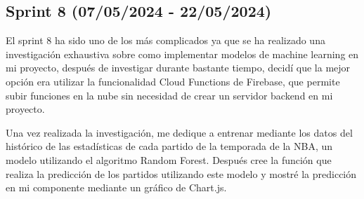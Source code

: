 \clearpage

\subsection{Sprint 8 (07/05/2024 - 22/05/2024)}
El sprint 8 ha sido uno de los más complicados ya que se ha realizado una investigación exhaustiva sobre como implementar modelos de machine learning en mi proyecto, después de investigar durante bastante tiempo, decidí que la mejor opción era utilizar la funcionalidad Cloud Functions de Firebase, que permite subir funciones en la nube sin necesidad de crear un servidor backend en mi proyecto.

Una vez realizada la investigación, me dedique a entrenar mediante los datos del histórico de las estadísticas de cada partido de la temporada de la NBA, un modelo utilizando el algoritmo Random Forest. Después cree la función que realiza la predicción de los partidos utilizando este modelo y mostré la predicción en mi componente mediante un gráfico de Chart.js.

\hfill


\hfill

